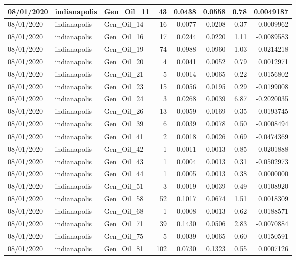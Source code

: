 \documentclass[
  letterpaper,
  DIV=11,
  numbers=noendperiod]{scrartcl}
\begin{document}
\begin{tabular}{l|l|l|r|r|r|r|r}
\hline
08/01/2020 & indianapolis & Gen\_Oil\_11 & 43 & 0.0438 & 0.0558 & 0.78 & 0.0049187\\
\hline
08/01/2020 & indianapolis & Gen\_Oil\_14 & 16 & 0.0077 & 0.0208 & 0.37 & 0.0009962\\
\hline
08/01/2020 & indianapolis & Gen\_Oil\_16 & 17 & 0.0244 & 0.0220 & 1.11 & -0.0089583\\
\hline
08/01/2020 & indianapolis & Gen\_Oil\_19 & 74 & 0.0988 & 0.0960 & 1.03 & 0.0214218\\
\hline
08/01/2020 & indianapolis & Gen\_Oil\_20 & 4 & 0.0041 & 0.0052 & 0.79 & 0.0012971\\
\hline
08/01/2020 & indianapolis & Gen\_Oil\_21 & 5 & 0.0014 & 0.0065 & 0.22 & -0.0156802\\
\hline
08/01/2020 & indianapolis & Gen\_Oil\_23 & 15 & 0.0056 & 0.0195 & 0.29 & -0.0199008\\
\hline
08/01/2020 & indianapolis & Gen\_Oil\_24 & 3 & 0.0268 & 0.0039 & 6.87 & -0.2020035\\
\hline
08/01/2020 & indianapolis & Gen\_Oil\_26 & 13 & 0.0059 & 0.0169 & 0.35 & 0.0193745\\
\hline
08/01/2020 & indianapolis & Gen\_Oil\_39 & 6 & 0.0039 & 0.0078 & 0.50 & -0.0008494\\
\hline
08/01/2020 & indianapolis & Gen\_Oil\_41 & 2 & 0.0018 & 0.0026 & 0.69 & -0.0474369\\
\hline
08/01/2020 & indianapolis & Gen\_Oil\_42 & 1 & 0.0011 & 0.0013 & 0.85 & 0.0201888\\
\hline
08/01/2020 & indianapolis & Gen\_Oil\_43 & 1 & 0.0004 & 0.0013 & 0.31 & -0.0502973\\
\hline
08/01/2020 & indianapolis & Gen\_Oil\_44 & 1 & 0.0005 & 0.0013 & 0.38 & 0.0000000\\
\hline
08/01/2020 & indianapolis & Gen\_Oil\_51 & 3 & 0.0019 & 0.0039 & 0.49 & -0.0108920\\
\hline
08/01/2020 & indianapolis & Gen\_Oil\_58 & 52 & 0.1017 & 0.0674 & 1.51 & 0.0018309\\
\hline
08/01/2020 & indianapolis & Gen\_Oil\_68 & 1 & 0.0008 & 0.0013 & 0.62 & 0.0188571\\
\hline
08/01/2020 & indianapolis & Gen\_Oil\_71 & 39 & 0.1430 & 0.0506 & 2.83 & -0.0070884\\
\hline
08/01/2020 & indianapolis & Gen\_Oil\_75 & 5 & 0.0039 & 0.0065 & 0.60 & -0.0150591\\
\hline
08/01/2020 & indianapolis & Gen\_Oil\_81 & 102 & 0.0730 & 0.1323 & 0.55 & 0.0007126\\

\end{tabular}
\end{document}
